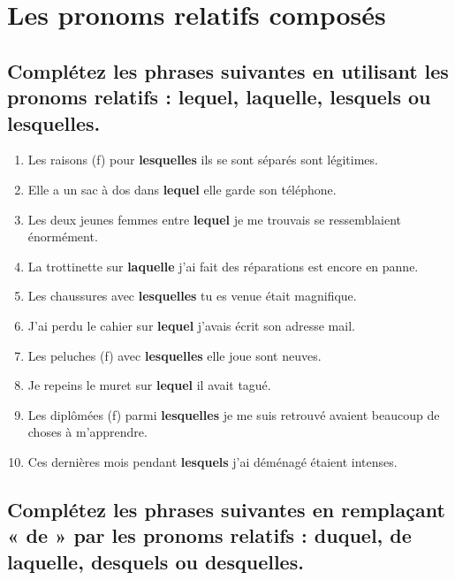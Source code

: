 \documentclass[12pt]{article}
\newcommand{\colo}[1]{{\color{blue}\textbf{#1}}}
\begin{document}
\section{Les pronoms relatifs composés} 
\subsection{Complétez les phrases suivantes en utilisant les pronoms relatifs : lequel, laquelle, lesquels ou lesquelles.} 
\begin{enumerate}
\item Les raisons (f) pour \colo{lesquelles} ils se sont séparés sont légitimes. 
\item Elle a un sac à dos dans \colo{lequel} elle garde son téléphone.
\item Les deux jeunes femmes entre \colo{lequel} je me trouvais se ressemblaient énormément. 
\item La trottinette sur \colo{laquelle} j’ai fait des réparations est encore en panne. 
\item Les chaussures avec \colo{lesquelles} tu es venue était magnifique. 
\item J’ai perdu le cahier sur \colo{lequel} j’avais écrit son adresse mail. 
\item Les peluches (f) avec \colo{lesquelles} elle joue sont neuves. \item Je repeins le muret sur \colo{lequel} il avait tagué.
\item Les diplômées (f) parmi \colo{lesquelles} je me suis retrouvé avaient beaucoup de choses à m’apprendre. 
\item Ces dernières mois pendant \colo{lesquels} j’ai déménagé étaient intenses.
\end{enumerate}


\subsection{Complétez les phrases suivantes en remplaçant « de » par les pronoms relatifs : duquel, de laquelle, desquels ou desquelles.}
\end{document}
